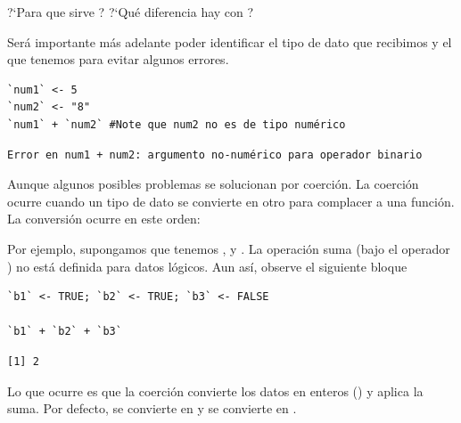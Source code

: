 \documentclass[8pt]{beamer}
\begin{document}
\begin{frame}[fragile]
	\begin{block}{}
		?`Para que sirve ? ?`Qu\'e diferencia hay con ?
	\end{block}
\end{frame}


\begin{frame}[fragile]
	Será importante más adelante poder identificar el tipo de dato que recibimos y el que tenemos para evitar algunos errores.
	
\begin{lstlisting}[style=RScript]
`num1` <- 5
`num2` <- "8"
`num1` + `num2` #Note que num2 no es de tipo numérico
\end{lstlisting}
\begin{lstlisting}[style=RConsole]
Error en num1 + num2: argumento no-numérico para operador binario
\end{lstlisting}
\end{frame}





\begin{frame}[fragile]
	Aunque algunos posibles problemas se solucionan por coerción. La coerción ocurre cuando un tipo de dato se convierte en otro para complacer a una función. La conversión ocurre en este orden:
	\begin{center}
	\end{center}
	Por ejemplo, supongamos que tenemos ,  y . La operación suma (bajo el operador \rscript{+}) no está definida para datos lógicos. Aun así, observe el siguiente bloque
\begin{lstlisting}[style=RScript]
`b1` <- TRUE; `b2` <- TRUE; `b3` <- FALSE

`b1` + `b2` + `b3`
\end{lstlisting}
\begin{lstlisting}[style=RConsole]
[1] 2
\end{lstlisting}
\end{frame}




\begin{frame}[fragile]
	Lo que ocurre es que la coerción convierte los datos en enteros () y aplica la suma. Por defecto,  se convierte en  y  se convierte en .
\end{frame}
\end{document}
